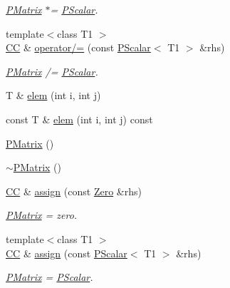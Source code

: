 \begin{DoxyCompactItemize}
\begin{DoxyCompactList}\small\item\em \mbox{\hyperlink{classENSEM_1_1PMatrix}{P\+Matrix}} $\ast$= \mbox{\hyperlink{classENSEM_1_1PScalar}{P\+Scalar}}. \end{DoxyCompactList}\item 
{\footnotesize template$<$class T1 $>$ }\\\mbox{\hyperlink{classENSEM_1_1PMatrix_a744bac549029029effe32dc1705660ec}{CC}} \& \mbox{\hyperlink{classENSEM_1_1PMatrix_ade8246cb542a62e3368d33026885ca59}{operator/=}} (const \mbox{\hyperlink{classENSEM_1_1PScalar}{P\+Scalar}}$<$ T1 $>$ \&rhs)
\begin{DoxyCompactList}\small\item\em \mbox{\hyperlink{classENSEM_1_1PMatrix}{P\+Matrix}} /= \mbox{\hyperlink{classENSEM_1_1PScalar}{P\+Scalar}}. \end{DoxyCompactList}\item 
T \& \mbox{\hyperlink{classENSEM_1_1PMatrix_a358c5f1cd954ddda32677d9ad8765ef2}{elem}} (int i, int j)
\item 
const T \& \mbox{\hyperlink{classENSEM_1_1PMatrix_a5cacb33b2dcd4c33a9d3a135528a8bdf}{elem}} (int i, int j) const
\item 
\mbox{\hyperlink{classENSEM_1_1PMatrix_ae32acebccb43c577a9e4dde0866a6c78}{P\+Matrix}} ()
\item 
\mbox{\hyperlink{classENSEM_1_1PMatrix_a3196ba50adba3cc1e72bb29ce0b02cda}{$\sim$\+P\+Matrix}} ()
\item 
\mbox{\hyperlink{classENSEM_1_1PMatrix_a744bac549029029effe32dc1705660ec}{CC}} \& \mbox{\hyperlink{classENSEM_1_1PMatrix_a4d8aeb469d2295dc8c555a0180ab0613}{assign}} (const \mbox{\hyperlink{structENSEM_1_1Zero}{Zero}} \&rhs)
\begin{DoxyCompactList}\small\item\em \mbox{\hyperlink{classENSEM_1_1PMatrix}{P\+Matrix}} = zero. \end{DoxyCompactList}\item 
{\footnotesize template$<$class T1 $>$ }\\\mbox{\hyperlink{classENSEM_1_1PMatrix_a744bac549029029effe32dc1705660ec}{CC}} \& \mbox{\hyperlink{classENSEM_1_1PMatrix_aa9ba4e8c3935c0591c0b63daef8edaa5}{assign}} (const \mbox{\hyperlink{classENSEM_1_1PScalar}{P\+Scalar}}$<$ T1 $>$ \&rhs)
\begin{DoxyCompactList}\small\item\em \mbox{\hyperlink{classENSEM_1_1PMatrix}{P\+Matrix}} = \mbox{\hyperlink{classENSEM_1_1PScalar}{P\+Scalar}}. \end{DoxyCompactList}\item 

\end{DoxyCompactItemize}
